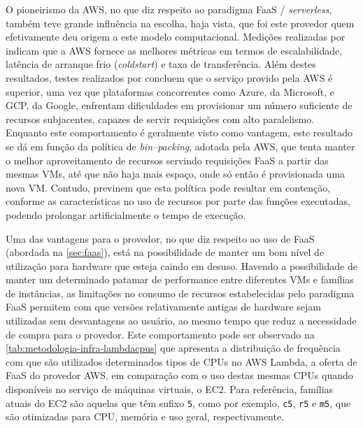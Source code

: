 \documentclass[english,brazilian]{UNISINOSmonografia} %
\begin{document}
O pioneirismo da AWS, no que diz respeito ao paradigma FaaS / \textit{serverless}, também teve grande influência na escolha, haja vista, que foi este provedor quem efetivamente deu origem a este modelo computacional.
Medições realizadas por  indicam que a AWS fornece as melhores métricas em termos de escalabilidade, latência de arranque frio (\textit{coldstart}) e taxa de transferência.
Além destes resultados, testes realizados por  concluem que o serviço provido pela AWS é superior, uma vez que plataformas concorrentes como Azure, da Microsoft, e GCP, da Google, enfrentam dificuldades em provisionar um número suficiente de recursos subjacentes, capazes de servir requisições com alto paralelismo.
Enquanto este comportamento é geralmente visto como vantagem, este resultado se dá em função da política de \textit{bin--packing}, adotada pela AWS, que tenta manter o melhor aproveitamento de recursos servindo requisições FaaS a partir das mesmas VMs, até que não haja mais espaço, onde só então é provisionada uma nova VM.
Contudo,  previnem que esta política pode resultar em contenção, conforme as características no uso de recursos por parte das funções executadas, podendo prolongar artificialmente o tempo de execução.


Uma das vantagens para o provedor, no que diz respeito ao uso de FaaS (abordada na \autoref{sec:faas}), está na possibilidade de manter um bom nível de utilização para hardware que esteja caindo em desuso.
Havendo a possibilidade de manter um determinado patamar de performance entre diferentes VMs e famílias de instâncias, as limitações no consumo de recursos estabelecidas pelo paradigma FaaS permitem com que versões relativamente antigas de hardware sejam utilizadas sem desvantagens ao usuário, ao mesmo tempo que reduz a necessidade de compra para o provedor.
Este comportamento pode ser observado na \autoref{tab:metodologia-infra-lambdacpus} que apresenta a distribuição de frequência com que são utilizados determinados tipos de CPUs no AWS Lambda, a oferta de FaaS do provedor AWS, em comparação com o uso destas mesmas CPUs quando disponíveis no serviço de máquinas virtuais, o EC2.
Para referência, famílias atuais do EC2 são aquelas que têm sufixo \texttt{5}, como por exemplo, \texttt{c5}, \texttt{r5} e \texttt{m5}, que são otimizadas para CPU, memória e uso geral, respectivamente.
\end{document}
